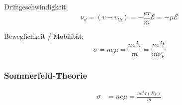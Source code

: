 Driftgeschwindigkeit:
\begin{equation*}
    \nu_d = (v-v_{th}) = -\frac{e \tau}{m} \mathcal{E} = -\mu \mathcal{E}
\end{equation*}

Beweglichkeit / Mobilität:
\begin{equation*}
    \sigma = n e \mu = \frac{n e^2 \tau}{m} = \frac{n e^2 l}{m \nu_F}
\end{equation*}

\subsubsection*{Sommerfeld-Theorie}

\begin{equation*}
    \begin{aligned}
        \sigma &= n e \mu = \frac{n e^2 \tau(E_F)}{m}
    \end{aligned}
\end{equation*}